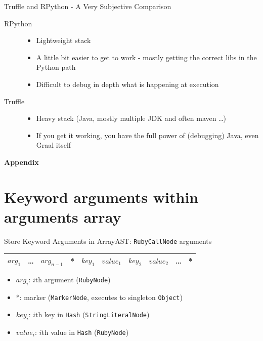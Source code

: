 \documentclass[xcolor=dvipsname,handout]{beamer} %
\begin{document}
\begin{frame}{Truffle and RPython - A Very Subjective Comparison}
\begin{description}
 \item[RPython] \begin{itemize}
  \item Lightweight stack
  \item A little bit easier to get to work - mostly getting the correct libs in the Python path
  \item Difficult to debug in depth what is happening at execution
\end{itemize}
\item[Truffle] \begin{itemize}
  \item Heavy stack (Java, mostly multiple JDK and often maven \dots)
  \item If you get it working, you have the full power of (debugging) Java, even Graal itself
\end{itemize}
\end{description}
\end{frame}


\appendix
\begin{frame}
\centering
\textbf{Appendix}
\end{frame}

\section{Keyword arguments within arguments array}

\begin{frame}{Store Keyword Arguments in Array}{AST: \lstinline{RubyCallNode} arguments}
\begin{table}
\begin{tabular}{|c|c|c|c|c|c|c|c|c|c|}
\hline
$\mathit{arg}_1$ & \ldots & $\mathit{arg}_{n-1}$ & * & $\mathit{key}_1$ & $\mathit{value}_1$ & $\mathit{key}_2$ & $\mathit{value}_2$ & \ldots & * \\
\hline
\end{tabular}
\end{table}
\begin{itemize}
    \item $\mathit{arg}_i$: $i$th argument (\lstinline{RubyNode})
    \item *: marker (\lstinline{MarkerNode}, executes to singleton \lstinline{Object})
    \item $\mathit{key}_i$: $i$th key in \lstinline{Hash} (\lstinline{StringLiteralNode})
    \item $\mathit{value}_i$: $i$th value in \lstinline{Hash} (\lstinline{RubyNode})
\end{itemize}
\end{frame}
\end{document}
